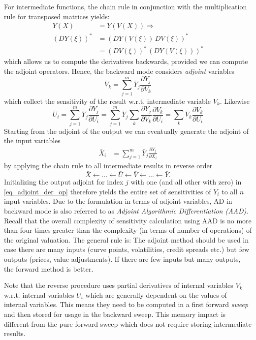\documentclass[12pt, a4paper]{report}
\begin{document}
For intermediate functions, the chain rule in conjunction with the multiplication rule for transposed matrices yields:
\begin{align*}
Y(X) &= Y(V(X)) \Rightarrow\\
(DY(\xi))^* &= (DY(V(\xi))\,DV(\xi))^* \\
&= (DV(\xi))^*\,(DY(V(\xi)))^*
\end{align*}
which allows us to compute the derivatives backwards, provided we can compute the adjoint operators. 
Hence, the backward mode considers {\em adjoint} variables
$$
\bar V_k = \sum_{j=1}^m \bar Y_j \frac{\partial Y_j}{\partial V_k}
$$ 
which collect the sensitivity of the result w.r.t. intermediate 
variable $V_k$. Likewise
$$
\bar U_i = \sum_{j=1}^m \bar Y_j \frac{\partial Y_j}{\partial U_i} 
= \sum_{j=1}^m \bar Y_j \sum_k \frac{\partial Y_j}{\partial
  V_k}\frac{\partial V_k}{\partial U_i} 
= \sum_k \bar V_k \frac{\partial V_k}{\partial U_i}
$$
Starting from the adjoint of the output we can eventually generate the
adjoint of the input variables 
\begin{align}
  \label{eq_adjoint_der_op}
\bar X_i & = \sum_{j=1}^m \bar Y_j \frac{\partial Y_j}{\partial X_i} 
\end{align}
by applying the chain rule to all intermediate results in reverse
order
$$
\bar X \leftarrow ... \leftarrow \bar U \leftarrow \bar V \leftarrow
... \leftarrow \bar Y.
$$  
Initializing the output adjoint for index $j$ with one (and all other
with zero) in \eqref{eq_adjoint_der_op} therefore yields the entire set of sensitivities of $Y_i$
to all $n$ input variables. Due to the formulation in terms of 
adjoint variables, AD in backward mode is also referred to as {\em Adjoint Algorithmic Differentiation
  (AAD)}.
Recall that the overall complexity of sensitivity calculation using AAD is no more than
four times greater than the complexity (in terms of number of operations) 
of the original valuation. The general rule is: The adjoint method should be used in case there
are many inputs (curve points, volatilities, credit spreads etc.) but few outputs (prices,
value adjustments). If there are few inputs but many outputs, the forward method is better.
 
\medskip
Note that the reverse procedure uses
partial derivatives of internal variables $V_k$ w.r.t. internal
variables $U_i$ which are generally dependent on the values of
internal variables. This means they need to be computed in a first
forward {\em sweep} and then stored for usage in the backward sweep.
This memory impact is different from the pure forward sweep which
does not require storing intermediate results.
\end{document}
